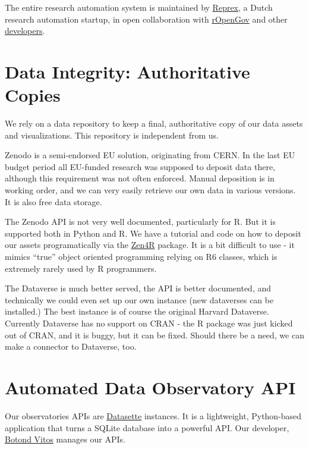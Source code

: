 \documentclass[
  a4paper,
  openany, a4paper, oneside]{book}
\begin{document}
The entire research automation system is maintained by \href{https://reprex.nl/}{Reprex}, a Dutch research automation startup, in open collaboration with \href{http://ropengov.org/}{rOpenGov} and other \href{https://greendeal.dataobservatory.eu/\#contributors}{developers}.

\hypertarget{zenodo}{%
\section{Data Integrity: Authoritative Copies}\label{zenodo}}

We rely on a data repository to keep a final, authoritative copy of our data assets and visualizations. This repository is independent from us.

Zenodo is a semi-endorsed EU solution, originating from CERN. In the last EU budget period all EU-funded research was supposed to deposit data there, although this requirement was not often enforced. Manual deposition is in working order, and we can very easily retrieve our own data in various versions. It is also free data storage.

The Zenodo API is not very well documented, particularly for R. But it is supported both in Python and R. We have a tutorial and code on how to deposit our assets programatically via the \href{https://github.com/eblondel/zen4R/wiki}{Zen4R} package. It is a bit difficult to use - it mimics ``true'' object oriented programming relying on R6 classes, which is extremely rarely used by R programmers.

The Dataverse is much better served, the API is better documented, and technically we could even set up our own instance (new dataverses can be installed.) The best instance is of course the original Harvard Dataverse. Currently Dataverse has no support on CRAN - the R package was just kicked out of CRAN, and it is buggy, but it can be fixed. Should there be a need, we can make a connector to Dataverse, too.

\hypertarget{api}{%
\section{Automated Data Observatory API}\label{api}}

Our observatories APIs are \href{https://datasette.io/}{Datasette} instances. It is a lightweight, Python-based application that turns a SQLite database into a powerful API. Our developer, \href{https://music.dataobservatory.eu/author/botond-vitos/}{Botond Vitos} manages our APIs.
\end{document}
